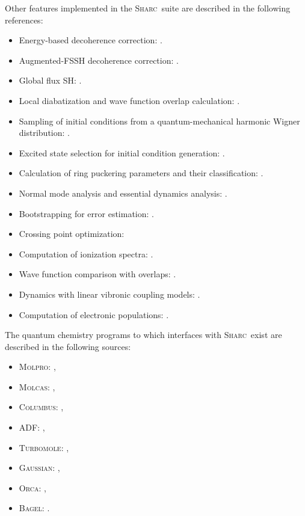 \documentclass[a4paper,10pt,DIV=15,openany]{scrbook}
\newcommand{\sharc}{\textsc{Sharc}}
\begin{document}
Other features implemented in the \sharc\ suite are described in the following references:
\begin{itemize}
  \item Energy-based decoherence correction: \cite{Granucci2007JCP}.
  \item Augmented-FSSH decoherence correction: \cite{Jain2016JCTC}.
  \item Global flux SH: \cite{Wang2014JCTC}.
  \item Local diabatization and wave function overlap calculation: \cite{Granucci2001JCP, Plasser2012JCP, Plasser2016JCTC}.
  \item Sampling of initial conditions from a quantum-mechanical harmonic Wigner distribution: \cite{Dahl1988JCP, Schinke1995, Barbatti2016IJQC}.
  \item Excited state selection for initial condition generation: \cite{Barbatti2007JPPA}.
  \item Calculation of ring puckering parameters and their classification: \cite{Cremer1975JACS, Boeyens1976JCMS}.
  \item Normal mode analysis \cite{Kurtz2001JCP,Plasser2009} and essential dynamics analysis: \cite{Amadei1993PSFB,Plasser2009}.
  \item Bootstrapping for error estimation: \cite{Nangia2004JCP}.
  \item Crossing point optimization: \cite{Bearpark1994CPL, Levine2008JPCB}
  \item Computation of ionization spectra: \cite{Ruckenbauer2016SR,Ruckenbauer2016JCP}.
  \item Wave function comparison with overlaps: \cite{Plasser2016JCP}.
  \item Dynamics with linear vibronic coupling models: \cite{Plasser2018PCCP}.
  \item Computation of electronic populations: \cite{Landry2013JCP}.
\end{itemize}

The quantum chemistry programs to which interfaces with \sharc\ exist are described in the following sources:
\begin{itemize}
  \item \textsc{Molpro}: \cite{Werner2012WCMS, Werner2012},
  \item \textsc{Molcas}: \cite{Karlstrom2003CMS, Aquilante2010JCC, Aquilante2015JCC},
  \item \textsc{Columbus}: \cite{Lischka2011WCMS, Lischka2012, Yabushita1999JPCA, Mai2014JCP_reindex},
  \item \textsc{ADF}: \cite{ADF2019},
  \item \textsc{Turbomole}: \cite{TURBOMOLE70},
  \item \textsc{Gaussian}: \cite{Gaussian09, Gaussian16},
  \item \textsc{Orca}: \cite{Neese2017WCMS},
  \item \textsc{Bagel}: \cite{Shiozaki2018WCMS}.
\end{itemize}
\end{document}
